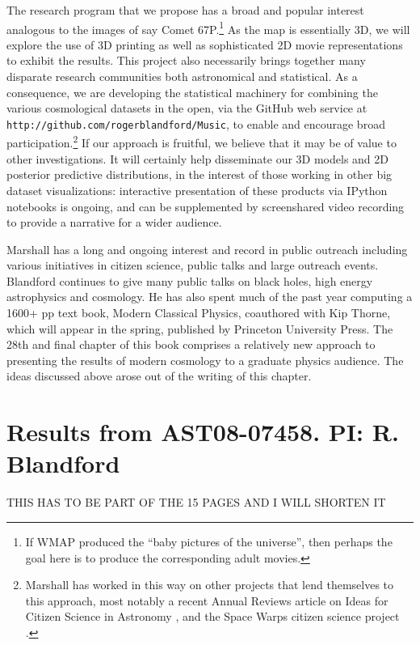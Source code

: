 \documentclass[psfig,11pt]{article}
\begin{document}
The research program that we propose has a broad and popular interest analogous to the images of say Comet 67P.\footnote{If WMAP produced the ``baby pictures of the universe'', then perhaps the goal here is to produce the corresponding adult movies.} As the map is essentially 3D, we will explore the use of 3D printing as well as sophisticated 2D movie representations to exhibit the results. This project also necessarily brings together many disparate research communities both astronomical and statistical. As a consequence, we are developing the statistical machinery for combining the various cosmological datasets in the open, via the GitHub web service at \texttt{http://github.com/rogerblandford/Music}, to enable and encourage broad participation.\footnote{Marshall has worked in this way on other projects that lend themselves to this approach, most notably a recent Annual Reviews article on Ideas for Citizen Science in Astronomy \cite{CitSciReview}, and the Space Warps citizen science project \cite{SpaceWarps}.}
If our approach is fruitful, we believe that it may be of value to other investigations. It will certainly help disseminate our 3D models and 2D posterior predictive distributions, in the interest of those working in other big dataset visualizations: interactive presentation of these products via IPython notebooks is ongoing, and can be supplemented by screenshared video recording to provide a narrative for a wider audience.

Marshall has a long and ongoing interest and record in public outreach including various initiatives in citizen science, public talks and large outreach events.  Blandford continues to give many public talks on black holes, high energy astrophysics and cosmology. He has also spent much of the past year computing a 1600+ pp text book, Modern Classical Physics, coauthored with Kip Thorne, which will appear in the spring, published by Princeton University Press. The 28th and final chapter of this book comprises a relatively new approach to presenting the results of modern cosmology to a graduate physics audience. The ideas discussed above arose out of the writing of this chapter.



\section{Results from AST08-07458. PI: R. Blandford}

THIS HAS TO BE PART OF THE 15 PAGES AND I WILL SHORTEN IT
\end{document}
